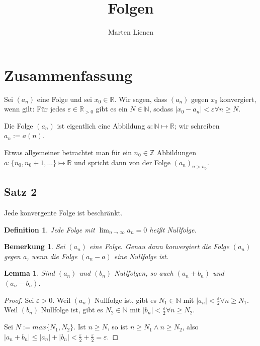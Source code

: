 \documentclass[a4paper,10pt]{article}
\title{Folgen}
\author{Marten Lienen}
\newtheorem*{definition}{Definition}
\newtheorem*{notice}{Bemerkung}
\newtheorem*{lemma}{Lemma}
\begin{document}
\maketitle

\section*{Zusammenfassung}

Sei $(a_n)$ eine Folge und sei $x_0 \in \mathbb{R}$.
Wir sagen, dass $(a_n)$ gegen $x_0$ konvergiert, wenn gilt: Für jedes $\varepsilon \in \mathbb{R}_{> 0}$ gibt es ein $N \in \mathbb{N}$, sodass $|x_0 - a_n| < \varepsilon \forall n \ge N$.

Die Folge $(a_n)$ ist eigentlich eine Abbildung $a: \mathbb{N} \mapsto \mathbb{R}$; wir schreiben $a_n := a(n)$.

Etwas allgemeiner betrachtet man für ein $n_0 \in \mathbb{Z}$ Abbildungen $a: \{n_0, n_0 + 1, \dots\} \mapsto \mathbb{R}$ und spricht dann von der Folge $(a_n)_{n > n_0}$.

\subsection*{Satz 2}

Jede konvergente Folge ist beschränkt.

\begin{definition}
 Jede Folge mit $\lim_{n \rightarrow \infty} a_n = 0$ heißt Nullfolge.
\end{definition}

\begin{notice}
 Sei $(a_n)$ eine Folge.
 Genau dann konvergiert die Folge $(a_n)$ gegen $a$, wenn die Folge $(a_n - a)$ eine Nullfolge ist.
\end{notice}

\begin{lemma}
 Sind $(a_n)$ und $(b_n)$ Nullfolgen, so auch $(a_n + b_n)$ und $(a_n - b_n)$.
\end{lemma}

\begin{proof}
 Sei $\varepsilon > 0$.
 Weil $(a_n)$ Nullfolge ist, gibt es $N_1 \in \mathbb{N}$ mit $|a_n| < \frac{\varepsilon}{2} \forall n \ge N_1$.
 Weil $(b_n)$ Nullfolge ist, gibt es $N_2 \in \mathbb{N}$ mit $|b_n| < \frac{\varepsilon}{2} \forall n \ge N_2$.
 
 Sei $N := max \{N_1, N_2\}$. Ist $n \ge N$, so ist $n \ge N_1 \land n \ge N_2$, also $|a_n + b_n| \le |a_n| + |b_n| < \frac{\varepsilon}{2} + \frac{\varepsilon}{2} = \varepsilon$.
\end{proof}
\end{document}
